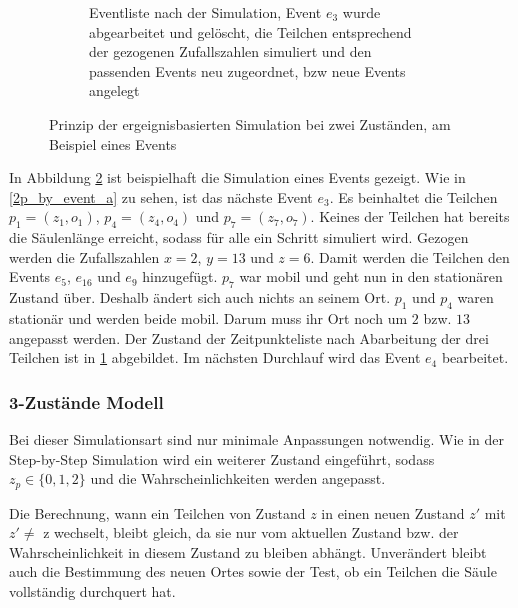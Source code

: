\begin{figure}
\begin{subfigure}[b]{\textwidth}
\caption{Eventliste nach der Simulation, Event $e_3$ wurde abgearbeitet und gelöscht, die Teilchen entsprechend der gezogenen Zufallszahlen simuliert und den passenden Events neu zugeordnet, bzw neue Events angelegt}
\label{2p_by_event_b}
\end{subfigure}
\caption[Prinzip der ergeignisbasierten Simulation bei zwei Zuständen]{Prinzip der ergeignisbasierten Simulation bei zwei Zuständen, am Beispiel eines Events} 
\label{2p_by_event}
\end{figure}

In Abbildung \ref{2p_by_event} ist beispielhaft die Simulation eines Events gezeigt. Wie in \ref{2p_by_event_a} zu sehen, ist das nächste Event $e_3$. Es beinhaltet die Teilchen $p_1 = (z_1, o_1)$, $p_4 = (z_4, o_4)$ und $p_7 = (z_7, o_7)$. Keines der Teilchen hat bereits die Säulenlänge erreicht, sodass für alle ein Schritt simuliert wird. Gezogen werden die Zufallszahlen $x=2$, $y=13$ und $z=6$. Damit werden die Teilchen den Events $e_5$, $e_{16}$ und $e_9$ hinzugefügt. $p_{7}$ war mobil und geht nun in den stationären Zustand über. Deshalb ändert sich auch nichts an seinem Ort. $p_1$ und $p_4$ waren stationär und werden beide mobil. Darum muss ihr Ort noch um $2$ bzw. $13$ angepasst werden. Der Zustand der Zeitpunkteliste nach Abarbeitung der drei Teilchen ist in \ref{2p_by_event_b} abgebildet. Im nächsten Durchlauf wird das Event $e_4$ bearbeitet.




\subsubsection{3-Zustände Modell}
Bei dieser Simulationsart sind nur minimale Anpassungen notwendig. Wie in der Step-by-Step Simulation wird ein weiterer Zustand eingeführt, sodass $z_p \in \{0,1,2\}$ und die Wahrscheinlichkeiten werden angepasst.

Die Berechnung, wann ein Teilchen von Zustand $z$ in einen neuen Zustand $z'$ mit $z' \neq $ z wechselt, bleibt gleich, da sie nur vom aktuellen Zustand bzw. der Wahrscheinlichkeit in diesem Zustand zu bleiben abhängt. Unverändert bleibt auch die Bestimmung des neuen Ortes sowie der Test, ob ein Teilchen die Säule vollständig durchquert hat. 

